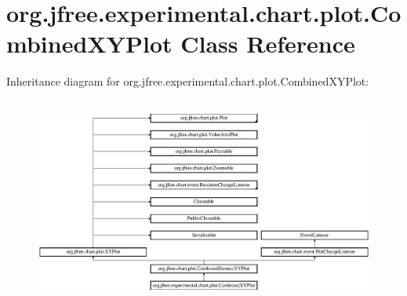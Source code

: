 \hypertarget{classorg_1_1jfree_1_1experimental_1_1chart_1_1plot_1_1_combined_x_y_plot}{}\section{org.\+jfree.\+experimental.\+chart.\+plot.\+Combined\+X\+Y\+Plot Class Reference}
\label{classorg_1_1jfree_1_1experimental_1_1chart_1_1plot_1_1_combined_x_y_plot}
Inheritance diagram for org.\+jfree.\+experimental.\+chart.\+plot.\+Combined\+X\+Y\+Plot\+:\begin{figure}[H]
\begin{center}
\leavevmode
\includegraphics[height=6.844445cm]{classorg_1_1jfree_1_1experimental_1_1chart_1_1plot_1_1_combined_x_y_plot}
\end{center}
\end{figure}
